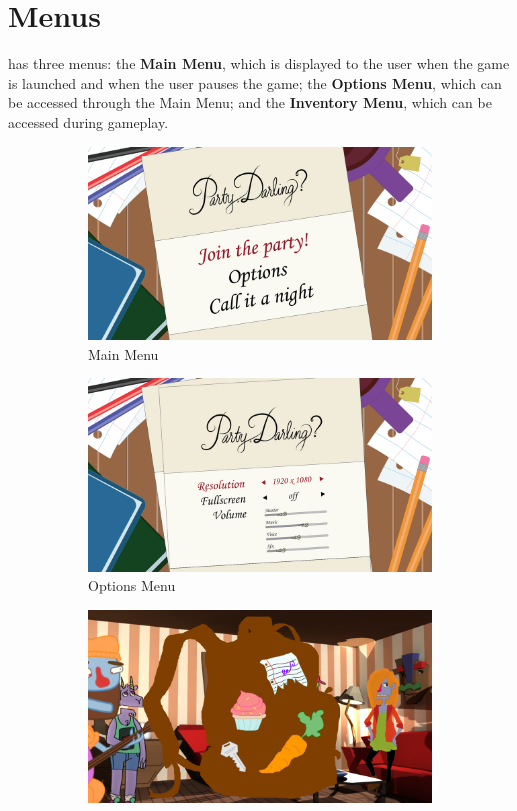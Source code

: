 \section{Menus}
\ourgame{} has three menus: the \textbf{Main Menu}, which is displayed to the user when the game is launched and when the user pauses the game; the \textbf{Options Menu}, which can be accessed through the Main Menu; and the \textbf{Inventory Menu}, which can be accessed during gameplay. 

\begin{figure}[htb]
  \centering\begin{subfigure}{.33\textwidth}
    \centering
    \includegraphics[width=.9\linewidth]{images/menu_main}
    \caption{Main Menu}
    \label{fig:menu_main}
  \end{subfigure}
  \begin{subfigure}{.33\textwidth}
    \centering
    \includegraphics[width=.9\linewidth]{images/menu_options}
    \caption{Options Menu}
    \label{fig:menu_options}
  \end{subfigure}
  \begin{subfigure}{.33\textwidth}
    \centering
    \includegraphics[width=.9\linewidth]{images/UI_inventory}

\end{subfigure}
\end{figure}
